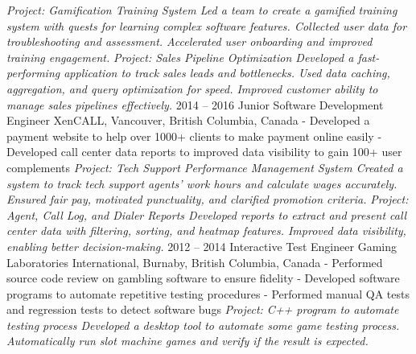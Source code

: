 \documentclass[9pt]{developercv} %
\begin{document}
\begin{entrylist}
{            \textit{Project: Gamification Training System\newline
            Led a team to create a gamified training system with quests for learning complex software features. 
            Collected user data for troubleshooting and assessment. 
            Accelerated user onboarding and improved training engagement. \newline\newline}
            \textit{Project: Sales Pipeline Optimization\newline
            Developed a fast-performing application to track sales leads and bottlenecks. 
            Used data caching, aggregation, and query optimization for speed. 
            Improved customer ability to manage sales pipelines effectively.\newline}
        }
	\entry
		{2014 -- 2016}
		{Junior Software Development Engineer}
		{XenCALL, Vancouver, British Columbia, Canada}
		{
            - Developed a payment website to help over 1000+ clients to make payment online easily\newline
            - Developed call center data reports to improved data visibility to gain 100+ user complements\newline
            \newline
            \textit{Project: Tech Support Performance Management System\newline
            Created a system to track tech support agents' work hours and calculate wages accurately. 
            Ensured fair pay, motivated punctuality, and clarified promotion criteria.
            \newline\newline}
            \textit{Project: Agent, Call Log, and Dialer Reports\newline
            Developed reports to extract and present call center data with filtering, sorting, and heatmap features. 
            Improved data visibility, enabling better decision-making.\newline}
        }
    \entry
		{2012 -- 2014}
		{Interactive Test Engineer}
		{Gaming Laboratories International, Burnaby, British Columbia, Canada}
		{
            - Performed source code review on gambling software to ensure fidelity\newline
            - Developed software programs to automate repetitive testing procedures\newline
            - Performed manual QA tests and regression tests to detect software bugs\newline\newline
            \textit{Project: C++ program to automate testing process\newline
            Developed a desktop tool to automate some game testing process. 
            Automatically run slot machine games and verify if the result is expected.\newline}
        }
\end{entrylist}
\end{document}
